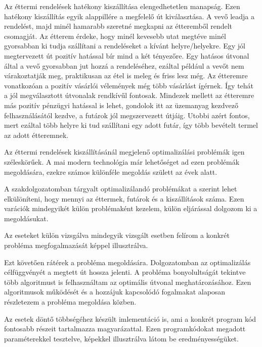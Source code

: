 
Az éttermi rendelések hatékony kiszállítása elengedhetetlen manapság. Ezen hatékony kiszállítás egyik alappillére a megfelelő út kiválasztása. A vevő leadja a rendelést, majd minél hamarabb szeretné megkapni az étteremből rendelt csomagját. Az étterem érdeke, hogy minél kevesebb utat megtéve minél gyorsabban ki tudja szállítani a rendeléseket a kívánt helyre/helyekre. Egy jól megtervezett út pozitív hatással bír mind a két tényezőre. Egy hatásos útvonal által a vevő gyorsabban jut hozzá a rendeléséhez, ezáltal például a vevőt nem várakoztatják meg, praktikusan az étel is meleg és friss lesz még. Az étteremre vonatkozóan a pozitív vásárlói vélemények még több vásárlást ígérnek. Így tehát a jól megválasztott útvonalak rendkívűl fontosak. Mindezek mellett az étteremre más pozitív pénzügyi hatással is lehet, gondolok itt az üzemanyag kezdvező felhasználásától kezdve, a futárok jól megszervezett útjáig. Utobbi azért fontos, mert ezáltal több helyre ki tud szállítani egy adott futár, így több bevételt termel az adott étteremnek.

Az éttermi rendelések kiszállításánál megjelenő optimalizálási problémák igen szé\-les\-körűek. A mai modern technológia már lehetőséget ad ezen problémák megoldására, ezekre számos különféle megoldás születt az évek alatt.

A szakdolgozatomban tárgyalt optimalizálandó problémákat a szerint lehet elkülöní\-teni, hogy mennyi az éttermek, futárok és a kiszállítások száma. Ezen varációk mindegyikét külön problémaként kezelem, külön eljárással dolgozom ki a megoldásukat.

Az eseteket külön vizsgálva mindegyik vizsgált esetben felírom a konkrét probléma megfogalmazását képpel illusztrálva.

Ezt követően rátérek a probléma megoldására. Dolgozatomban az optimalizálás célfüggvényét a megtett út hossza jelenti. A probléma bonyolultságát tekintve több algoritmust is felhasználtam az optimális útvonal meghatározásához. Ezen algoritmusok működését és a hozzájuk kapcsolódó fogalmakat alaposan részletezem a probléma megoldása közben.

Az esetek döntő többségéhez készült imlementáció is, ami a konkrét program kód fontosabb részeit tartalmazza magyarázattal.
Ezen programkódokat megadott paramé\-te\-rekkel tesztelve, képekkel illusztrálva látom be eredményességüket.
